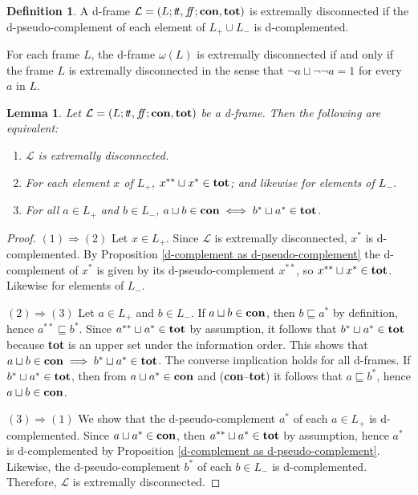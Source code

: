 \documentclass[11pt]{article}
\theoremstyle{plain}
\newtheorem{lem}[thm]{Lemma}
\theoremstyle{definition}
\newtheorem{defn}[thm]{Definition}
\newcommand{\dbt}{{t\!t}}
\newcommand{\dbf}{{f\!\!f}}
\begin{document}
\begin{defn}\label{extremally disconnected d-frame} A d-frame $\mathcal{L}=(L;\dbt,\dbf;{\bf con},{\bf tot})$ is extremally disconnected if the d-pseudo-complement of each element  of $L_+\cup L_-$ is d-complemented. \end{defn}

For each frame $L$,   the d-frame $\omega(L)$ is extremally disconnected if and only if the frame $L$ is extremally disconnected  \cite[page 101]{Johnstone} in the sense that $\neg a\sqcup\neg\neg a=1$ for every $a$ in $L$.  

\begin{lem}Let $\mathcal{L}=(L;\dbt,\dbf;{\bf con},{\bf tot})$ be a d-frame. Then the following are equivalent: \begin{enumerate}[label=\rm(\arabic*)] \setlength{\itemsep}{0pt}
\item $\mathcal{L}$ is extremally disconnected.
\item For each element $x$ of $L_+$, $x^{**}\sqcup x^{*}\in{\bf tot}$; and likewise for elements of $L_-$.
\item For all $a\in L_{+}$ and $b\in L_{-}$,  $a\sqcup b\in{\bf con}\iff b^*\sqcup a^*\in{\bf tot}$. \end{enumerate} \end{lem}

\begin{proof}
$(1)\Rightarrow(2)$ Let $x\in L_{+}$. Since $\mathcal{L}$ is extremally disconnected,  $x^*$ is d-complemented.  By Proposition \ref{d-complement as d-pseudo-complement} the d-complement of $x^*$ is given by its d-pseudo-complement $x^{**}$, so $x^{**}\sqcup x^{*}\in{\bf tot}$. Likewise for elements of $L_-$.

$(2)\Rightarrow(3)$ Let $a\in L_{+}$ and $b\in L_{-}$. If $a\sqcup b\in{\bf con}$, then $b\sqsubseteq a^*$ by definition, hence $a^{**}\sqsubseteq b^*$. Since $a^{**}\sqcup a^{*}\in{\bf tot}$ by assumption, it follows that $b^*\sqcup a^*\in{\bf tot}$ because {\bf tot} is an upper set  under the information order. This shows that $a\sqcup b\in{\bf con}\implies b^*\sqcup a^*\in{\bf tot}$. The converse implication holds for all d-frames. If $b^*\sqcup a^*\in{\bf tot}$, then from $a\sqcup a^*\in{\bf con}$ and ({\bf con}--{\bf tot}) it follows that $a\sqsubseteq b^*$, hence $a\sqcup b\in{\bf con}$.  

$(3)\Rightarrow(1)$ We show that the d-pseudo-complement $a^*$ of each  $a\in L_{+}$ is d-complemented. Since $a\sqcup a^*\in{\bf con}$, then $a^{**}\sqcup a^*\in{\bf tot}$ by assumption, hence $a^*$ is d-complemented by Proposition \ref{d-complement as d-pseudo-complement}. Likewise, the d-pseudo-complement $b^*$ of each  $b\in L_{-}$ is d-complemented. Therefore, $\mathcal{L}$ is extremally disconnected.
\end{proof}
\end{document}
